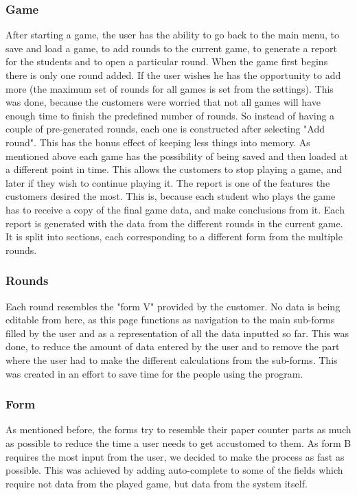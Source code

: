 \documentclass{l3proj}
\begin{document}
\subsubsection{Game}
After starting a game, the user has the ability to go back to the main menu, to save and load a game, to add rounds to the current game, to generate a report for the students and to open a particular round. 
When the game first begins there is only one round added. If the user wishes he has the opportunity to add more (the maximum set of rounds for all games is set from the settings). This was done, because the customers were worried that not all games will have enough time to finish the predefined number of rounds. So instead of having a couple of pre-generated rounds, each one is constructed after selecting "Add round". This has the bonus effect of keeping less things into memory.
As mentioned above each game has the possibility of being saved and then loaded at a different point in time. This allows the customers to stop playing a game, and later if they wish to continue playing it.
The report is one of the features the customers desired the most. This is, because each student who plays the game has to receive a copy of the final game data, and make conclusions from it. Each report is generated with the data from the different rounds in the current game. It is split into sections, each corresponding to a different form from the multiple rounds.


\subsubsection{Rounds}
Each round resembles the "form V" provided by the customer. No data is being editable from here, as this page functions as navigation to the main sub-forms filled by the user and as a representation of all the data inputted so far. This was done, to reduce the amount of data entered by the user and to remove the part where the user had to make the different calculations from the sub-forms. This was created in an effort to save time for the people using the program.

\subsubsection{Form}
As mentioned before, the forms try to resemble their paper counter parts as much as possible to reduce the time a user needs to get accustomed to them. As form B requires the most input from the user, we decided to make the process as fast as possible. This was achieved by adding auto-complete to some of the fields which require not data from the played game, but data from the system itself.
\end{document}
